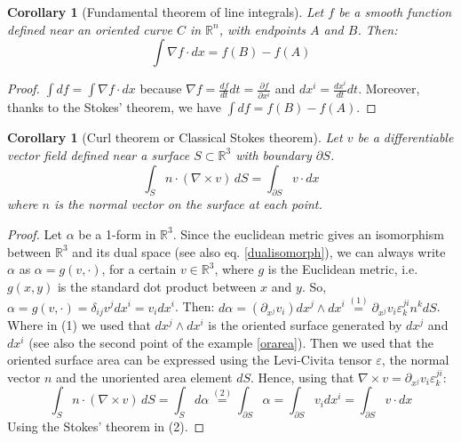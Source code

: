 \documentclass[a4paper,11pt,titlepage, article, oneside]{memoir}
\numberwithin{equation}{section}
\newtheorem{corollary}[theorem]{Corollary}
\theoremstyle{definition}
\theoremstyle{remark}
\newcommand{\rfield}{\mathbb{R}}
\begin{document}
\begin{corollary}[Fundamental theorem of line integrals]
  Let $f$ be a smooth function defined near an oriented curve $C$ in $\rfield^n$, with endpoints $A$ and $B$.
  Then:
  \begin{equation}
    \int \nabla f \cdot dx = f(B)-f(A) %
  \end{equation}
\end{corollary}
\begin{proof}
	$\int df = \int \nabla f \cdot dx$ because $\nabla f = \frac{df}{dt} dt = \frac{\partial f}{\partial x^i}$ and $dx^i = \frac{dx^i}{dt}dt$. Moreover, thanks to the Stokes' theorem, we have $\int df  = f(B) - f(A)$.
\end{proof}

\begin{corollary}[Curl theorem or Classical Stokes theorem]
  Let $v$ be a differentiable vector field defined near a surface $S \subset \rfield^3$ with boundary $\partial S$.
  \begin{equation}
    \int_S n \cdot (\nabla \times v) \, dS = \int_{\partial S} v \cdot dx
  \end{equation}
  where $n$ is the normal vector on the surface at each point.
\end{corollary}
\begin{proof}
Let $\alpha$ be a 1-form in $\rfield^3$. Since the euclidean metric gives an isomorphism between $\rfield^3$ and its dual space (see also eq. \eqref{dualisomorph}), we can always write $\alpha$ as $\alpha = g(v, \cdot)$, for a certain $v \in \rfield^3$, where $g$ is the Euclidean metric, i.e. $g(x, y)$ is the standard dot product between $x$ and $y$. So, $\alpha = g(v, \cdot) = \delta_{ij} v^j dx^i = v_i dx^i$. Then: $d \alpha = (\partial_{x^j} v_i) dx^j \wedge dx^i \overset{(1)}{=} \partial_{x^j} v_i \varepsilon^{ji}_k n^k dS$. Where in (1) we used that $dx^j \wedge dx^i$ is the oriented surface generated by $dx^j$ and $dx^i$ (see also the second point of the example \ref{orarea}). Then we used that the oriented surface area can be expressed using the Levi-Civita tensor $\varepsilon$, the normal vector $n$ and the unoriented area element $dS$. Hence, using that $\nabla \times v = \partial_{x^j} v_i \varepsilon^{ji}_k$:
$$\int_S n \cdot (\nabla \times v) \, dS = \int_S d\alpha \overset{(2)}{=} \int_{\partial S} \alpha = \int_{\partial S} v_i dx^i = \int_{\partial S} v \cdot dx$$
Using the Stokes' theorem in (2).
\end{proof}
\end{document}
